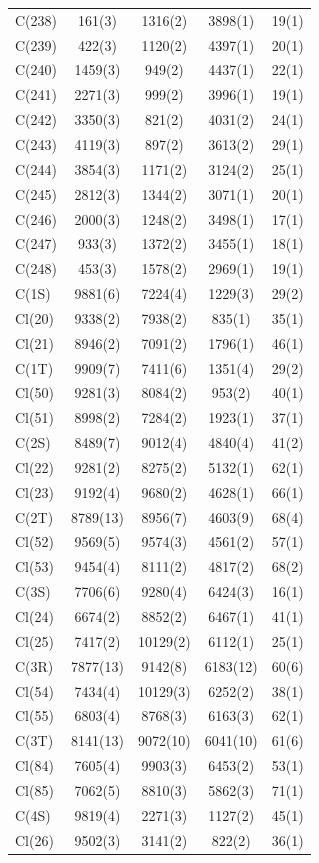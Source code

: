 \begin{center}
{\begin{supertabular}{lcccc}
C(238)&161(3)&1316(2)&3898(1)&19(1)\\
C(239)&422(3)&1120(2)&4397(1)&20(1)\\
C(240)&1459(3)&949(2)&4437(1)&22(1)\\
C(241)&2271(3)&999(2)&3996(1)&19(1)\\
C(242)&3350(3)&821(2)&4031(2)&24(1)\\
C(243)&4119(3)&897(2)&3613(2)&29(1)\\
C(244)&3854(3)&1171(2)&3124(2)&25(1)\\
C(245)&2812(3)&1344(2)&3071(1)&20(1)\\
C(246)&2000(3)&1248(2)&3498(1)&17(1)\\
C(247)&933(3)&1372(2)&3455(1)&18(1)\\
C(248)&453(3)&1578(2)&2969(1)&19(1)\\
C(1S)&9881(6)&7224(4)&1229(3)&29(2)\\
Cl(20)&9338(2)&7938(2)&835(1)&35(1)\\
Cl(21)&8946(2)&7091(2)&1796(1)&46(1)\\
C(1T)&9909(7)&7411(6)&1351(4)&29(2)\\
Cl(50)&9281(3)&8084(2)&953(2)&40(1)\\
Cl(51)&8998(2)&7284(2)&1923(1)&37(1)\\
C(2S)&8489(7)&9012(4)&4840(4)&41(2)\\
Cl(22)&9281(2)&8275(2)&5132(1)&62(1)\\
Cl(23)&9192(4)&9680(2)&4628(1)&66(1)\\
C(2T)&8789(13)&8956(7)&4603(9)&68(4)\\
Cl(52)&9569(5)&9574(3)&4561(2)&57(1)\\
Cl(53)&9454(4)&8111(2)&4817(2)&68(2)\\
C(3S)&7706(6)&9280(4)&6424(3)&16(1)\\
Cl(24)&6674(2)&8852(2)&6467(1)&41(1)\\
Cl(25)&7417(2)&10129(2)&6112(1)&25(1)\\
C(3R)&7877(13)&9142(8)&6183(12)&60(6)\\
Cl(54)&7434(4)&10129(3)&6252(2)&38(1)\\
Cl(55)&6803(4)&8768(3)&6163(3)&62(1)\\
C(3T)&8141(13)&9072(10)&6041(10)&61(6)\\
Cl(84)&7605(4)&9903(3)&6453(2)&53(1)\\
Cl(85)&7062(5)&8810(3)&5862(3)&71(1)\\
C(4S)&9819(4)&2271(3)&1127(2)&45(1)\\
Cl(26)&9502(3)&3141(2)&822(2)&36(1)\\

\end{supertabular}}
\end{center}
